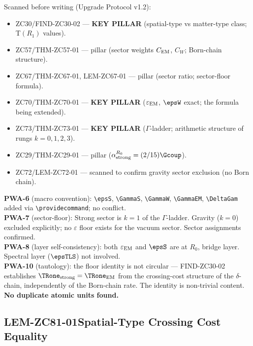 \documentclass[12pt, a4paper]{article}
\renewcommand{\epsEM}{\varepsilon_{\rm EM}}
\begin{document}
\begin{formalbox}[title={Pre-Work Audit Record --- ZC81}]
Scanned before writing (Upgrade Protocol v1.2):
\begin{itemize}[leftmargin=2em, noitemsep]
  \item ZC30/FIND-ZC30-02 --- \textbf{KEY PILLAR}
    (spatial-type vs matter-type class; T$(R_1)$ values).
  \item ZC57/THM-ZC57-01 --- pillar (sector weights $C_{\rm EM}$,
    $C_W$; Born-chain structure).
  \item ZC67/THM-ZC67-01, LEM-ZC67-01 --- pillar (sector ratio;
    sector-floor formula).
  \item ZC70/THM-ZC70-01 --- \textbf{KEY PILLAR}
    ($\epsEM$, $\epsW$ exact; the formula being extended).
  \item ZC73/THM-ZC73-01 --- \textbf{KEY PILLAR}
    ($\Gamma$-ladder; arithmetic structure of rungs $k=0,1,2,3$).
  \item ZC29/THM-ZC29-01 --- pillar
    ($\alpha_{\rm strong}^{R_0} = (2/15)\Gcoup$).
  \item ZC72/LEM-ZC72-01 --- scanned to confirm gravity sector
    exclusion (no Born chain).
\end{itemize}

\textbf{PWA-6} (macro convention): \texttt{\textbackslash epsS},
\texttt{\textbackslash GammaS}, \texttt{\textbackslash GammaW},
\texttt{\textbackslash GammaEM}, \texttt{\textbackslash DeltaGam}
added via \texttt{\textbackslash providecommand}; no conflict.\\
\textbf{PWA-7} (sector-floor): Strong sector is $k=1$ of the
$\Gamma$-ladder. Gravity ($k=0$) excluded explicitly; no $\varepsilon$
floor exists for the vacuum sector. Sector assignments confirmed.\\
\textbf{PWA-8} (layer self-consistency): both $\epsEM$ and $\epsS$
are at $R_0$, bridge layer. Spectral layer ($\epsTLS$) not involved.\\
\textbf{PWA-10} (tautology): the floor identity is not circular ---
FIND-ZC30-02 establishes $\TRone_{\rm strong} = \TRone_{\rm EM}$
from the crossing-cost structure of the $\delta$-chain, independently
of the Born-chain rate. The identity is non-trivial content.\\
\textbf{No duplicate atomic units found.}
\end{formalbox}

\newpage

\subsection{LEM-ZC81-01\quad Spatial-Type Crossing Cost Equality}
\label{sec:lem01}
\end{document}
